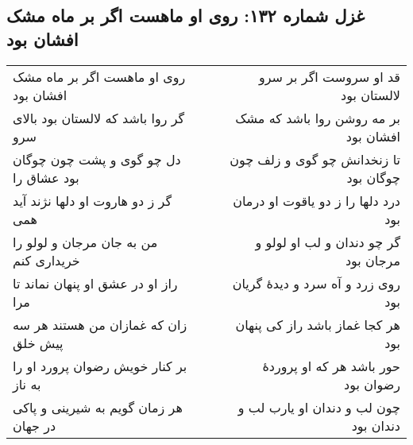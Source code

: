 \begin{center}
\section*{غزل شماره ۱۳۲: روی او ماهست اگر بر ماه مشک افشان بود}
\label{sec:132}
\begin{longtable}{l p{0.5cm} r}
روی او ماهست اگر بر ماه مشک افشان بود
&&
قد او سروست اگر بر سرو لالستان بود
\\
گر روا باشد که لالستان بود بالای سرو
&&
بر مه روشن روا باشد که مشک افشان بود
\\
دل چو گوی و پشت چون چوگان بود عشاق را
&&
تا زنخدانش چو گوی و زلف چون چوگان بود
\\
گر ز دو هاروت او دلها نژند آید همی
&&
درد دلها را ز دو یاقوت او درمان بود
\\
من به جان مرجان و لولو را خریداری کنم
&&
گر چو دندان و لب او لولو و مرجان بود
\\
راز او در عشق او پنهان نماند تا مرا
&&
روی زرد و آه سرد و دیدهٔ گریان بود
\\
زان که غمازان من هستند هر سه پیش خلق
&&
هر کجا غماز باشد راز کی پنهان بود
\\
بر کنار خویش رضوان پرورد او را به ناز
&&
حور باشد هر که او پروردهٔ رضوان بود
\\
هر زمان گویم به شیرینی و پاکی در جهان
&&
چون لب و دندان او یارب لب و دندان بود
\\
\end{longtable}
\end{center}
